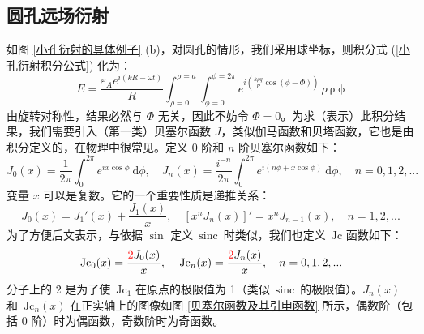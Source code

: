 \documentclass[UTF8]{report}
\def\sinc{\mathrm{\,sinc}\,}
\def\Jc{\mathrm{\,Jc}}
\theoremstyle{MyLineTheoremStyle} %
\theoremstyle{MyBlockTheoremStyle} %
\theoremstyle{MySubsubsectionStyle} %
\begin{document}
\subsection{圆孔远场衍射}
如图 \ref{小孔衍射的具体例子} (b)，对圆孔的情形，我们采用球坐标，则积分式 (\ref{小孔衍射积分公式}) 化为：
\begin{equation}
E = \frac{\varepsilon_A e^{i(kR - \omega t)}}{R} \int_{\rho = 0}^{\rho = a} \int_{\phi = 0}^{\phi = 2\pi} e^{i\left(\frac{k\rho q}{R} \cos (\phi - \Phi)\right)} \,\rho \ \mathrm{\rho} \ \mathrm{\phi}
\end{equation}
由旋转对称性，结果必然与 $\Phi$ 无关，因此不妨令 $\Phi = 0$。为求（表示）此积分结果，我们需要引入（第一类）贝塞尔函数 $J$，类似伽马函数和贝塔函数，它也是由积分定义的，在物理中很常见。定义 0 阶和 $n$ 阶贝塞尔函数如下：
\begin{equation}
J_0(x) = \frac{1}{2\pi} \int_{0}^{2\pi} e^{i x \cos \phi} \ \mathrm{d}\phi
,\quad 
J_n(x) = \frac{i^{-n}}{2\pi} \int_{0}^{2\pi} e^{i(n\phi + x\cos \phi)} \ \mathrm{d}\phi,\quad n = 0, 1, 2, ...
\end{equation}
变量 $x$ 可以是复数。它的一个重要性质是递推关系：
\begin{equation}
    J_0(x) = J_1'(x) + \frac{J_1(x)}{x},\quad \left[x^nJ_n(x)\right]' = x^nJ_{n-1}(x),\quad n = 1, 2, ...
\end{equation}
为了方便后文表示，与依据 $\sin$ 定义 $\sinc$ 时类似，我们也定义 $\Jc$ 函数如下：
\begin{equation}
\Jc_0(x) = \frac{{\color{red} 2} J_0(x)}{x},\quad \Jc_n(x) = \frac{{\color{red} 2} J_n(x)}{x},\quad n = 0, 1, 2, ...
\end{equation} 
分子上的 2 是为了使 $\Jc_1$ 在原点的极限值为 1（类似 $\sinc$ 的极限值）。$J_n(x)$ 和 $\Jc_n(x)$ 在正实轴上的图像如图 \ref{贝塞尔函数及其引申函数} 所示，偶数阶（包括 0 阶）时为偶函数，奇数阶时为奇函数。
\end{document}
